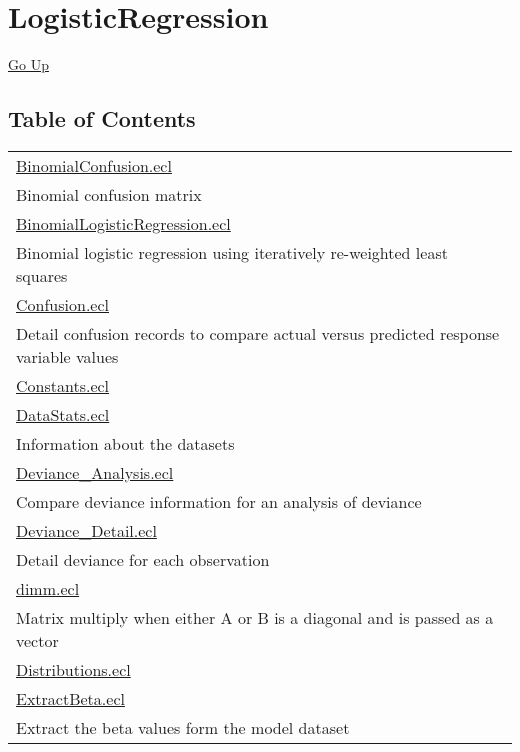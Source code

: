 \chapter*{\color{headtoc} LogisticRegression}
\hypertarget{ecldoc:toc:root/LogisticRegression}{}
\hyperlink{ecldoc:toc:}{Go Up}


\section*{Table of Contents}
{\renewcommand{\arraystretch}{1.5}
\begin{longtable}{|p{\textwidth}|}
\hline
\hyperlink{ecldoc:toc:LogisticRegression.BinomialConfusion}{BinomialConfusion.ecl} \\
Binomial confusion matrix \\
\hline
\hyperlink{ecldoc:toc:LogisticRegression.BinomialLogisticRegression}{BinomialLogisticRegression.ecl} \\
Binomial logistic regression using iteratively re-weighted least squares \\
\hline
\hyperlink{ecldoc:toc:LogisticRegression.Confusion}{Confusion.ecl} \\
Detail confusion records to compare actual versus predicted response variable values \\
\hline
\hyperlink{ecldoc:toc:LogisticRegression.Constants}{Constants.ecl} \\
\hline
\hyperlink{ecldoc:toc:LogisticRegression.DataStats}{DataStats.ecl} \\
Information about the datasets \\
\hline
\hyperlink{ecldoc:toc:LogisticRegression.Deviance_Analysis}{Deviance\_Analysis.ecl} \\
Compare deviance information for an analysis of deviance \\
\hline
\hyperlink{ecldoc:toc:LogisticRegression.Deviance_Detail}{Deviance\_Detail.ecl} \\
Detail deviance for each observation \\
\hline
\hyperlink{ecldoc:toc:LogisticRegression.dimm}{dimm.ecl} \\
Matrix multiply when either A or B is a diagonal and is passed as a vector \\
\hline
\hyperlink{ecldoc:toc:LogisticRegression.Distributions}{Distributions.ecl} \\
\hline
\hyperlink{ecldoc:toc:LogisticRegression.ExtractBeta}{ExtractBeta.ecl} \\
Extract the beta values form the model dataset \\

\end{longtable}}

